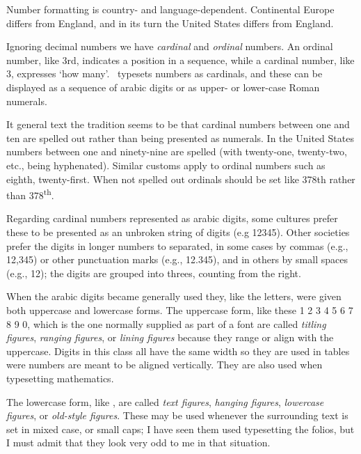 \documentclass[10pt,letterpaper,extrafontsizes]{memoir}
\begin{document}

    Number formatting is country- and language-dependent. Continental 
Europe differs
from England, and in its turn the United States differs from England.

    Ignoring decimal numbers we have \emph{cardinal} and \emph{ordinal}
numbers. An ordinal number, like 3rd, 
indicates a position in a sequence,
while a cardinal number, like 3, 
expresses `how many'. \ltx\ typesets
numbers as cardinals, and these can be displayed as a sequence of
arabic digits or as upper- or lower-case Roman numerals. 

    It general text the tradition seems to be that cardinal numbers between
one and ten are spelled out rather than being presented as numerals.
In the United States numbers between one and ninety-nine are spelled (with
twenty-one, twenty-two, etc., being hyphenated). Similar customs
apply to ordinal numbers such as eighth, twenty-first. When not spelled out
ordinals should be set like 378th rather than 378\textsuperscript{th}.


    Regarding cardinal numbers represented as arabic digits,
some cultures prefer these to be presented as an unbroken string of
digits (e.g 12345). Other societies prefer the digits in longer 
numbers to separated, in some cases by commas (e.g., 12,345) or other 
punctuation marks (e.g., 12.345), and in others by small spaces (e.g., 12); 
the digits are grouped into threes, counting from the right.

   When the arabic digits became generally used they, like the letters, 
were given both uppercase and lowercase forms. The uppercase form, like these
1 2 3 4 5 6 7 8 9 0, which
is the one normally supplied as part of a font are called 
\emph{titling figures}, 
\emph{ranging figures}, or
\emph{lining figures} because
they range or align with the uppercase.
Digits in this class all
have the same width so they are used in tables were numbers are meant to
be aligned vertically. They are also used when typesetting mathematics.

    The lowercase form, like , are called
\emph{text figures},
\emph{hanging figures},
\emph{lowercase figures}, or
\emph{old-style figures}.
These may be used whenever the surrounding text is set in mixed case, or small caps; I
have seen them used typesetting the folios, but I must admit that they look very odd
to me in that situation.
\end{document}
